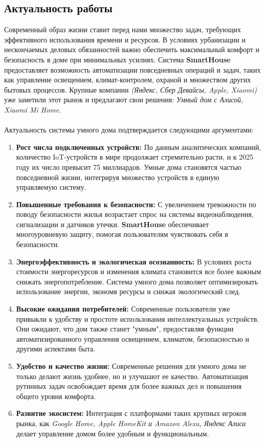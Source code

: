 \documentclass{article}
\begin{document}
\subsection{Актуальность работы}
    Современный образ жизни ставит перед нами множество задач, требующих эффективного использования времени и ресурсов. В условиях урбанизации и нескончаемых деловых обязанностей важно обеспечить максимальный комфорт и безопасность в доме при минимальных усилиях. Система \textbf{SmartHouse} предоставляет возможность автоматизации повседневных операций и задач, таких как управление освещением, климат-контролем, охраной и множеством других бытовых процессов. Крупные компании \textit{(Яндекс, Сбер Девайсы, Apple, Xiaomi)} уже заметили этот рынок и предлагают свои решения: \textit{Умный дом с Алисой, Xiaomi Mi Home}. \\ \\
Актуальность системы умного дома подтверждается следующими аргументами:

\begin{enumerate}
     \item \textbf{Рост числа подключенных устройств:} По данным аналитических компаний, количество IoT-устройств в мире продолжает стремительно расти, и к 2025 году их число превысит 75 миллиардов. Умные дома становятся частью повседневной жизни, интегрируя множество устройств в единую управляемую систему.
     
    \item \textbf{Повышенные требования к безопасности:} С увеличением тревожности по поводу безопасности жилья возрастает спрос на системы видеонаблюдения, сигнализации и датчиков утечки. \textbf{SmartHouse} обеспечивает многоуровневую защиту, помогая пользователям чувствовать себя в безопасности.
   
    \item \textbf{Энергоэффективность и экологическая осознанность:} В условиях роста стоимости энергоресурсов и изменения климата становится все более важным снижать энергопотребление. Система умного дома позволяет оптимизировать использование энергии, экономя ресурсы и снижая экологический след.
   
    \item \textbf{Высокие ожидания потребителей:} Современные пользователи уже привыкли к удобству и простоте использования интеллектуальных устройств. Они ожидают, что дом также станет "умным", предоставляя функции автоматизированного управления освещением, климатом, безопасностью и другими аспектами быта.
   
    \item \textbf{Удобство и качество жизни:} Современные решения для умного дома не только делают жизнь удобнее, но и улучшают ее качество. Автоматизация рутинных задач освобождает время для более важных дел и повышения общего уровня комфорта.

    \item \textbf{Развитие экосистем:} Интеграция с платформами таких крупных игроков рынка, как \textit{Google Home, Apple HomeKit и Amazon Alexa, Яндекс Алиса} делает управление домом более удобным и функциональным.

\end{enumerate}
\end{document}
